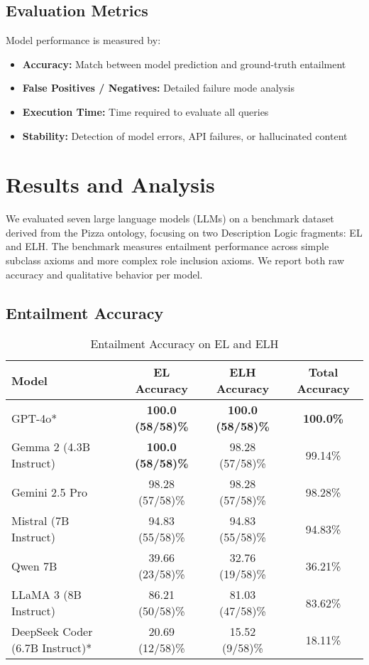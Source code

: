 \documentclass[11pt]{article}
\begin{document}
\subsection{Evaluation Metrics}
Model performance is measured by:
\begin{itemize}
    \item \textbf{Accuracy:} Match between model prediction and ground-truth entailment
    \item \textbf{False Positives / Negatives:} Detailed failure mode analysis
    \item \textbf{Execution Time:} Time required to evaluate all queries
    \item \textbf{Stability:} Detection of model errors, API failures, or hallucinated content
\end{itemize}


\section{Results and Analysis}

We evaluated seven large language models (LLMs) on a benchmark dataset derived from the Pizza ontology, focusing on two Description Logic fragments: EL and ELH. The benchmark measures entailment performance across simple subclass axioms and more complex role inclusion axioms. We report both raw accuracy and qualitative behavior per model.

\subsection{Entailment Accuracy}
\begin{table}[H]
\centering
\caption{Entailment Accuracy on EL and ELH}
\label{tab:accuracy}
\begin{tabular}{|l|c|c|c|}
\hline
\textbf{Model} & \textbf{EL Accuracy} & \textbf{ELH Accuracy} & \textbf{Total Accuracy} \\
\hline
GPT-4o* & \textbf{100.0 (58/58)\%} & \textbf{100.0 (58/58)\%} & \textbf{100.0\%} \\
Gemma 2 (4.3B Instruct) & \textbf{100.0 (58/58)\%} & 98.28 (57/58)\% & 99.14\% \\
Gemini 2.5 Pro & 98.28 (57/58)\% & 98.28 (57/58)\% & 98.28\% \\
Mistral (7B Instruct) & 94.83 (55/58)\% & 94.83 (55/58)\% & 94.83\% \\
Qwen 7B & 39.66 (23/58)\% & 32.76 (19/58)\% & 36.21\% \\
LLaMA 3 (8B Instruct) & 86.21 (50/58)\% & 81.03 (47/58)\% & 83.62\% \\
DeepSeek Coder (6.7B Instruct)* & 20.69 (12/58)\% & 15.52 (9/58)\% & 18.11\% \\
\hline
\end{tabular}
\end{table}
\end{document}
